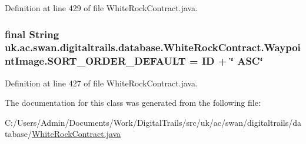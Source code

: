 Definition at line 429 of file White\+Rock\+Contract.\+java.

\hypertarget{classuk_1_1ac_1_1swan_1_1digitaltrails_1_1database_1_1_white_rock_contract_1_1_waypoint_image_aa500f49ec782da034cbe23934e723318}{
\subsubsection[{S\+O\+R\+T\+\_\+\+O\+R\+D\+E\+R\+\_\+\+D\+E\+F\+A\+U\+L\+T}]{\setlength{\rightskip}{0pt plus 5cm}final String uk.\+ac.\+swan.\+digitaltrails.\+database.\+White\+Rock\+Contract.\+Waypoint\+Image.\+S\+O\+R\+T\+\_\+\+O\+R\+D\+E\+R\+\_\+\+D\+E\+F\+A\+U\+L\+T = I\+D + \char`\"{} A\+S\+C\char`\"{}\hspace{0.3cm}{\ttfamily [static]}}}\label{classuk_1_1ac_1_1swan_1_1digitaltrails_1_1database_1_1_white_rock_contract_1_1_waypoint_image_aa500f49ec782da034cbe23934e723318}


Definition at line 427 of file White\+Rock\+Contract.\+java.



The documentation for this class was generated from the following file\+:\begin{DoxyCompactItemize}
\item 
C\+:/\+Users/\+Admin/\+Documents/\+Work/\+Digital\+Trails/src/uk/ac/swan/digitaltrails/database/\hyperlink{_white_rock_contract_8java}{White\+Rock\+Contract.\+java}\end{DoxyCompactItemize}
